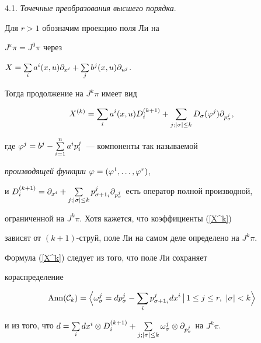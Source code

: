 \medskip





4.1. {\it Точечные преобразования высшего порядка}.


Для $r>1$ обозначим проекцию поля Ли на


$J^\varepsilon\pi=J^0\pi$ через


$X=\sum\limits_ia^i(x,u)\partial_{x^i}+\sum\limits_jb^j(x,u)\partial_{u^j}$.


Тогда продолжение на $J^k\pi$ имеет вид


\begin{equation}\label{X^k}


X^{(k)}=\sum_ia^i(x,u)D_i^{(k+1)}+\sum_{j;|\z|\le k}


D_\z(\vp^j)\p_{p^j_\z},


\end{equation}


где $\varphi^j=b^j-\sum\limits^n_{i=1}a^ip^j_i$~--- компоненты так называемой


{\em производящей функции} $\varphi=(\varphi^1,\dotsc,\varphi^r)$,


и $D_i^{(k+1)}=\p_{x^i}+\sum\limits_{j;|\z|\le


k}p^j_{\z+1_i}\p_{p_\z^j}$ есть оператор полной производной,


ограниченной на $J^k\pi$. Хотя кажется, что коэффициенты (\ref{X^k})


зависят от $(k+1)$-струй, поле Ли на самом деле определено на $J^k\pi$.





Формула (\ref{X^k}) следует из того, что поле Ли сохраняет


кораспределение


$$


\Ann(\C_k)=\Big\langle\oo_\z^j=dp_\z^j-\sum_ip_{\z+1_i}^jdx^i


\,\big|\, 1\le j\le r,\ |\z|<k\Big\rangle


$$


и из того, что $d=\sum\limits_i dx^i\ot D_i^{(k+1)}+ \sum\limits_{j;|\z|\le


k}\oo_\z^j\ot\p_{p_\z^j}$ на $J^k\pi$.





